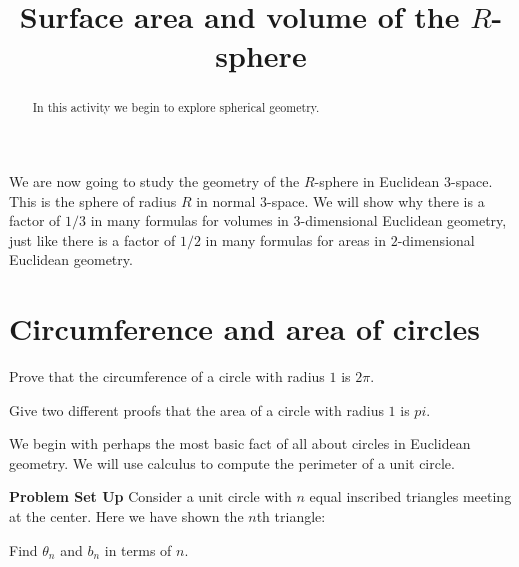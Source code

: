 \documentclass[newpage,hints,handout]{ximera}
\title{Surface area and volume of the $R$-sphere}
\begin{document}
\begin{abstract}
In this activity we begin to explore spherical geometry.
\end{abstract}
\maketitle


We are now going to study the geometry of the $R$-sphere in Euclidean
$3$-space. This is the sphere of radius $R$ in normal $3$-space.  We
will show why there is a factor of $1/3$ in many formulas for volumes
in $3$-dimensional Euclidean geometry, just like there is a factor of
$1/2$ in many formulas for areas in $2$-dimensional Euclidean
geometry.



\section{Circumference and area of circles}
\begin{listOutcomes}
 \item Prove that the circumference of a circle with radius $1$ is $2\pi$.
 \item Give two different proofs that the area of a circle with radius $1$ is $pi$.
\end{listOutcomes}

We begin with perhaps the most basic fact of all about circles in
Euclidean geometry. We will use calculus to compute the perimeter of a unit
circle.

{\bf Problem Set Up} Consider a unit circle with $n$ equal inscribed triangles meeting at the center.
Here we have shown the $n$th triangle:
\begin{image}
\end{image}

Find $\theta_n$ and $b_n$ in terms of $n$.
\end{document}
